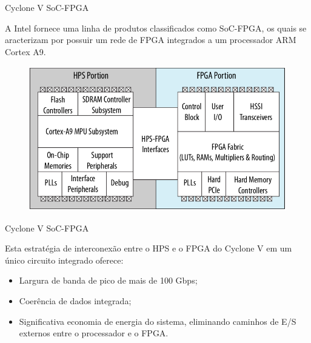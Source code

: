 \documentclass[10pt]{beamer}
\begin{document}
\begin{frame}{Cyclone V SoC-FPGA}
		\vspace{0.1cm}
		\begin{justify}
			A Intel fornece uma linha de produtos classificados como SoC-FPGA, os quais se aracterizam por possuir um rede de FPGA integrados a um processador ARM Cortex A9.
		\end{justify}
		\begin{figure}[h]
			\begin{center}
				\includegraphics[scale=0.29]{imagens/socfpga.png}\\
			\end{center}
			\label{fig:SoC}
		\end{figure}
\end{frame}

\begin{frame}{Cyclone V SoC-FPGA}
	\begin{alertblock}{}
		\vspace{0.1cm}
		\begin{justify}
			Esta estratégia de interconexão entre o HPS e o FPGA do Cyclone V em um único
			circuito integrado oferece:
		\end{justify}
		\vspace{0.25cm}
		\begin{itemize}
			\setlength\itemsep{1em}
        	\item Largura de banda de pico de mais de 100 Gbps;
        	\item Coerência de dados integrada;
        	\item Significativa economia de energia do sistema, eliminando caminhos de E/S externos
			entre o processador e o FPGA.
        \end{itemize}
	\end{alertblock}
\end{frame}
\end{document}
